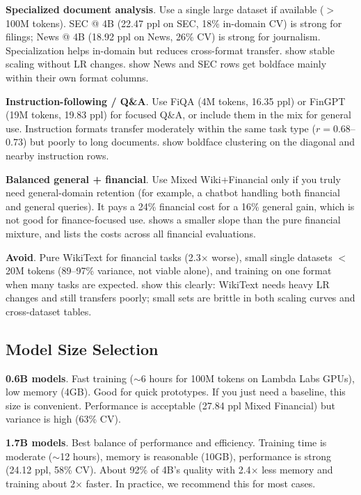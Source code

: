 \textbf{Specialized document analysis}. Use a single large dataset if available ($>$ 100M tokens). SEC @ 4B (22.47 ppl on SEC, 18\% in-domain CV) is strong for filings; News @ 4B (18.92 ppl on News, 26\% CV) is strong for journalism. Specialization helps in-domain but reduces cross-format transfer.  show stable scaling without LR changes.  show News and SEC rows get boldface mainly within their own format columns.

\textbf{Instruction-following / Q\&A}. Use FiQA (4M tokens, 16.35 ppl) or FinGPT (19M tokens, 19.83 ppl) for focused Q\&A, or include them in the mix for general use. Instruction formats transfer moderately within the same task type ($r = 0.68$--$0.73$) but poorly to long documents.  show boldface clustering on the diagonal and nearby instruction rows.

\textbf{Balanced general + financial}. Use Mixed Wiki+Financial only if you truly need general-domain retention (for example, a chatbot handling both financial and general queries). It pays a 24\% financial cost for a 16\% general gain, which is not good for finance-focused use.  shows a smaller slope than the pure financial mixture, and  lists the costs across all financial evaluations.

\textbf{Avoid}. Pure WikiText for financial tasks (2.3$\times$ worse), small single datasets $<$ 20M tokens (89--97\% variance, not viable alone), and training on one format when many tasks are expected.  show this clearly: WikiText needs heavy LR changes and still transfers poorly; small sets are brittle in both scaling curves and cross-dataset tables.

\subsection{Model Size Selection}

\textbf{0.6B models}. Fast training ($\sim$6 hours for 100M tokens on Lambda Labs GPUs), low memory (4GB). Good for quick prototypes. If you just need a baseline, this size is convenient. Performance is acceptable (27.84 ppl Mixed Financial) but variance is high (63\% CV).

\textbf{1.7B models}. Best balance of performance and efficiency. Training time is moderate ($\sim$12 hours), memory is reasonable (10GB), performance is strong (24.12 ppl, 58\% CV). About 92\% of 4B's quality with 2.4$\times$ less memory and training about 2$\times$ faster. In practice, we recommend this for most cases.

